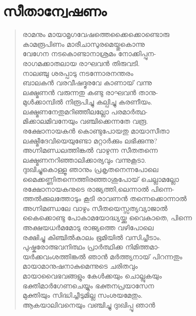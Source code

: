 \section{സീതാന്വേഷണം}

\begin{verse}
രാമനും മായാമൃഗവേഷത്തെക്കൈക്കൊണ്ടൊരു\\
കാമരൂപിണം മാരീചാസുരമെയ്തുകൊന്നു\\
വേഗേന നടകൊണ്ടാനാശ്രമം നോക്കിപ്പുന-\\
രാഗമക്കാതലായ രാഘവന്‍ തിരുവടി.\\
നാലഞ്ചു ശരപ്പാടു നടന്നോരനന്തരം\\
ബാലകന്‍ വരവീഷദ്ദൂരവേ കാണായ് വന്നു\\
ലക്ഷ്മണന്‍ വരുന്നതു കണ്ടു രാഘവന്‍ താനു-\\
മുള്‍ക്കാമ്പില്‍ നിരൂപിച്ചു കല്പിച്ചു കരണീയം.\\
ലക്ഷ്മണനേതുമറിഞ്ഞീലല്ലോ പരമാര്‍ത്ഥ-\\
മിക്കാലമിവനേയും വഞ്ചിക്കെന്നതേ വരൂ.\\
രക്ഷോനായകന്‍ കൊണ്ടുപോയതു മായാസീതാ\\
ലക്ഷ്മീദേവിയെയുണ്ടോ മറ്റാര്‍ക്കും ലഭിക്കുന്നു?\\
അഗ്നിമണ്ഡലത്തിങ്കല്‍ വാഴുന്ന സീതതന്നെ\\
ലക്ഷ്മണനറിഞ്ഞാലിക്കാര്യവും വന്നുകൂടാ.\\
ദുഃഖിച്ചുകൊള്ളൂ ഞാനും പ്രകൃതനെന്നപോലെ\\
മൈക്കണ്ണിതന്നെത്തിരഞ്ഞാശുപോയ് ചെല്ലാമല്ലോ\\
രക്ഷോനായകനുടെ രാജ്യത്തി,ലെന്നാല്‍ പിന്നെ-\\
ത്തല്‍ക്കുലത്തോടും കൂടി രാവണന്‍ \hbox{തന്നെക്കൊന്നാല്‍}\\
അഗ്നിമണ്ഡലേ വാഴും സീതയെസ്സത്യവ്യാജാല്‍\\
കൈക്കൊണ്ടു പോകാമയോദ്ധ്യയ്ക്കു വൈകാതെ, \hbox{പിന്നെ}\\
അക്ഷയധര്‍മമോടു രാജ്യത്തെ വഴിപോലെ\\
രക്ഷിച്ചു കിഞ്ചില്‍കാലം ഭൂമിയില്‍ വസിച്ചീടാം.\\
പുഷ്കരോത്ഭവനിത്ഥം പ്രാര്‍ത്ഥിക്ക നിമിത്തമാ-\\
യര്‍ക്കവംശത്തിങ്കല്‍ ഞാന്‍ മര്‍ത്ത്യനായ് \hbox{പിറന്നതും}\\
മായാമാനുഷനാകുമെന്നുടെ ചരിതവും\\
മായാവൈഭവങ്ങളും കേള്‍ക്കയും ചൊല്ലുകയും\\
ഭക്തിമാര്‍ഗേണചെയ്യും ഭക്തനപ്രയാസേന\\
മുക്തിയും സിദ്ധിച്ചീടുമില്ല സംശയമേതും.\\
ആകയാലിവനെയും വഞ്ചിച്ചു ദുഃഖിപ്പൂ ഞാന്‍\\

\end{verse}
